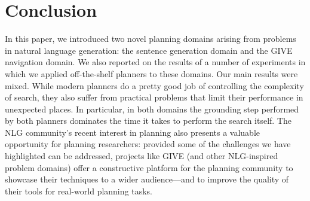 \section{Conclusion} \label{sec:conclusion}

In this paper, we introduced two novel planning domains arising from
problems in natural language generation: the sentence generation domain and
the GIVE navigation domain. We also reported on the results of a number of
experiments in which we applied off-the-shelf planners to these domains.
Our main results were mixed. While modern planners do a pretty good job of
controlling the complexity of search, they also suffer from practical
problems that limit their performance in unexpected places. In particular,
in both domains the grounding step performed by both planners dominates the
time it takes to perform the search itself. The NLG community's recent
interest in planning also presents a valuable opportunity for planning
researchers: provided some of the challenges we have highlighted can be
addressed, projects like GIVE (and other NLG-inspired problem domains)
offer a constructive platform for the planning community to showcase their
techniques to a wider audience---and to improve the quality of their tools
for real-world planning tasks.




